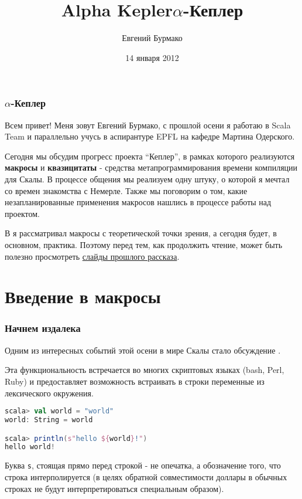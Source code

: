 \documentclass[hyperref={bookmarks=false}]{beamer}
\title{Alpha Kepler}
\begin{document}
\title{$\alpha$-Кеплер}
\author{Евгений Бурмако}
\date{14 января 2012}
\maketitle

\begin{frame}[t,fragile]
\frametitle{$\alpha$-Кеплер}

Всем привет! Меня зовут Евгений Бурмако, с прошлой осени я работаю в Scala Team и параллельно учусь в аспирантуре EPFL на кафедре Мартина Одерского.

Сегодня мы обсудим прогресс проекта ``Кеплер'', в рамках которого реализуются \textbf{макросы} и \textbf{квазицитаты} - средства метапрограммирования времени компиляции для Скалы. В процессе общения мы реализуем одну штуку, о которой я мечтал со времен знакомства с Немерле. Также мы поговорим о том, какие незапланированные применения макросов нашлись в процессе работы над проектом.

В  я рассматривал макросы с теоретической точки зрения, а сегодня будет, в основном, практика. Поэтому перед тем, как продолжить чтение, может быть полезно просмотреть {\color{linkblue}\href{http://scalamacros.org/talks/2011-10-29-RuProjectKepler.pdf}{слайды прошлого рассказа}}.
\end{frame}

\section{Введение в макросы}

\begin{frame}[t,fragile]
\frametitle{Начнем издалека}

Одним из интересных событий этой осени в мире Скалы стало обсуждение .

Эта функциональность встречается во многих скриптовых языках (bash, Perl, Ruby) и предоставляет возможность встраивать в строки переменные из лексического окружения.

\begin{lstlisting}[language=scala]
scala> val world = "world"
world: String = world

scala> println(s"hello ${world}!")
hello world!
\end{lstlisting}%

Буква \texttt{s}, стоящая прямо перед строкой - не опечатка, а обозначение того, что строка интерполируется (в целях обратной совместимости доллары в обычных строках не будут интерпретироваться специальным образом).
\end{frame}
\end{document}
